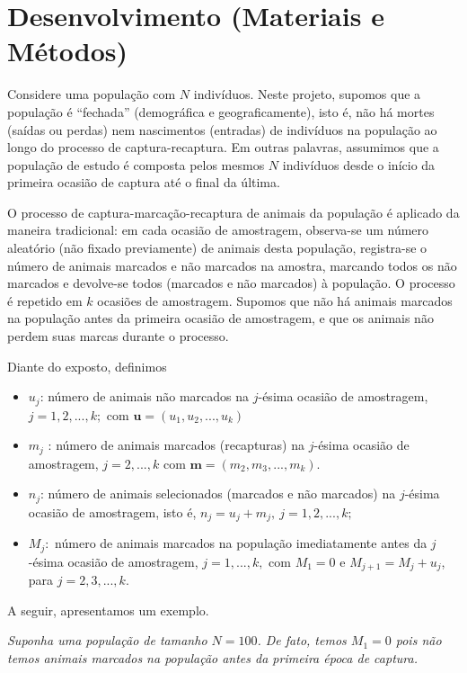 \documentclass[
]{book}
\begin{document}
\hypertarget{desenvolvimento-materiais-e-muxe9todos}{%
\chapter{Desenvolvimento (Materiais e Métodos)}\label{desenvolvimento-materiais-e-muxe9todos}}

Considere uma população com \(N\) indivíduos. Neste projeto, supomos que a população é ``fechada'' (demográfica e geograficamente), isto é, não há mortes (saídas ou perdas) nem nascimentos (entradas) de indivíduos na população ao longo do processo de captura-recaptura. Em outras palavras, assumimos que a população de estudo é composta pelos mesmos \(N\) indivíduos desde o início da primeira ocasião de captura até o final da última.

O processo de captura-marcação-recaptura
de animais da população é aplicado da maneira tradicional: em cada ocasião de amostragem, observa-se um número aleatório (não fixado previamente) de animais desta população, registra-se o número de animais marcados e não marcados na amostra, marcando todos os não marcados e devolve-se todos (marcados e não marcados) à população. O processo é repetido em \(k\) ocasiões de amostragem. Supomos que não há animais marcados na população antes da primeira ocasião de amostragem, e que os animais não perdem suas marcas durante o processo.

Diante do exposto, definimos

\begin{itemize}
\item
  \(u_j\): número de animais não marcados na \(j\)-ésima ocasião de amostragem, \(j = 1, 2, . . . , k;\) com \(\mathbf{u}=(u_1, u_2, . . . , u_k)\)
\item
  \(m_j\) : número de animais marcados (recapturas) na \(j\)-ésima ocasião de amostragem, \(j = 2, . . . , k\) com \(\mathbf{m} = (m_2, m_3, . . . , m_k)\).
\item
  \(n_j\): número de animais selecionados (marcados e não marcados) na \(j\)-ésima ocasião de amostragem, isto é, \(n_j = u_j + m_j, ~j = 1 , 2, . . . , k;\)
\item
  \(M_j:\) número de animais marcados na população imediatamente antes da \(j\)-ésima ocasião de amostragem, \(j = 1, . . . , k,\) com \(M_1 = 0\) e \(M_{j+1} = M_j + u_j\), para \(j =2, 3, . . . , k.\)
\end{itemize}

A seguir, apresentamos um exemplo.

\emph{Suponha uma população de tamanho \(N = 100\). De fato, temos \(M_1 = 0\) pois não temos animais marcados na população antes da primeira época de captura.}
\end{document}
